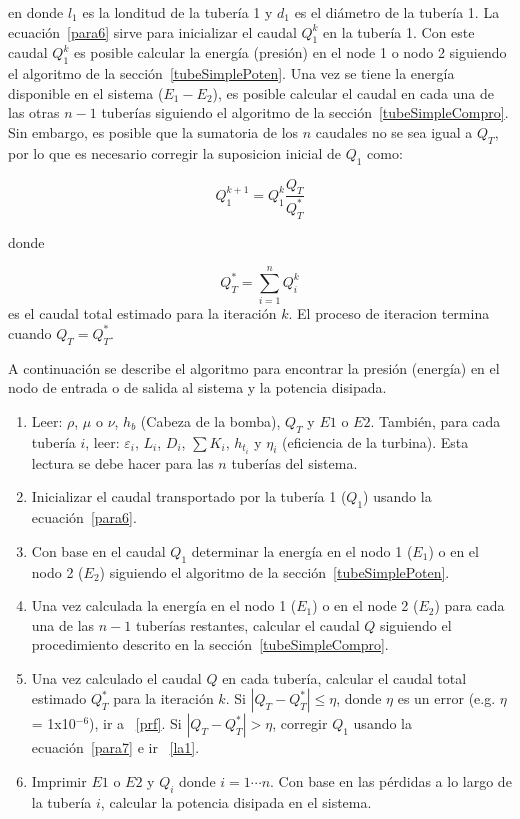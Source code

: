 \documentclass[11pt, oneside]{article}
\begin{document}
en donde $l_1$ es la londitud de la tuber\'ia 1 y $d_1$ es el di\'ametro de la tuber\'ia 1. La ecuaci\'on~\ref{para6} sirve para inicializar el caudal $Q_1^k$ en la tuber\'ia 1. Con este caudal $Q_1^k$ es posible calcular la energ\'ia (presi\'on) en el node 1 o nodo 2 siguiendo el algoritmo de la secci\'on~\ref{tubeSimplePoten}. Una vez se tiene la energ\'ia disponible en el sistema ($E_1-E_2$), es posible calcular el caudal en cada una de las otras $n-1$ tuber\'ias siguiendo el algoritmo de la secci\'on~\ref{tubeSimpleCompro}. Sin embargo, es posible que la sumatoria de los $n$ caudales no se sea igual a $Q_T$, por lo que es necesario corregir la suposicion inicial de $Q_1$ como:

\begin{equation}
Q_1^{k+1}= Q_1^k \frac{Q_T}{Q_T^*}
\label{para7}
\end{equation}

donde

\begin{equation}
Q_T^* = \sum_{i=1}^n Q_i^k 
\label{para8}
\end{equation}
es el caudal total estimado para la iteraci\'on $k$. El proceso de iteracion termina cuando $Q_T = Q_T^*$.

A continuaci\'on se describe el algoritmo para encontrar la presi\'on (energ\'ia) en el nodo de entrada o de salida al sistema y la potencia disipada. 

\begin{enumerate}
\item Leer: $\rho$, $\mu$ o $\nu$, $h_{b}$ (Cabeza de la bomba), $Q_T$ y $E1$ o $E2$. Tambi\'en, para cada tuber\'ia $i$, leer: $\varepsilon_i$, $L_i$, $D_i$, $\sum K_i$, $h_{t_i}$ y $\eta_i$ (eficiencia de la turbina). Esta lectura se debe hacer para las $n$ tuber\'ias del sistema.
\item Inicializar el caudal transportado por la tuber\'ia 1 ($Q_1$) usando la ecuaci\'on~\ref{para6}.
\item \label{la1} Con base en el caudal $Q_1$ determinar la energ\'ia en el nodo 1 ($E_1$) o en el nodo 2 ($E_2$) siguiendo el algoritmo de la secci\'on~\ref{tubeSimplePoten}.
\item Una vez calculada la energ\'ia en el nodo 1 ($E_1$) o en el node 2 ($E_2$) para cada una de las $n-1$ tuber\'ias restantes, calcular el caudal $Q$ siguiendo el procedimiento descrito en la secci\'on~\ref{tubeSimpleCompro}.  
\item Una vez calculado el caudal $Q$ en cada tuber\'ia, calcular el caudal total estimado $Q_T^*$ para la iteraci\'on $k$. Si $|Q_T - Q_T^*| \leq \eta$, donde $\eta$ es un error  (e.g. $\eta$ = 1x10$^{-6}$), ir a ~\ref{prf}. Si $|Q_T - Q_T^*| > \eta$, corregir $Q_1$ usando la ecuaci\'on~\ref{para7} e ir ~\ref{la1}.
\item \label{prf} Imprimir $E1$ o $E2$ y $Q_i$ donde $i=1 \cdots n$. Con base en las p\'erdidas a lo largo de la tuber\'ia $i$, calcular la potencia disipada en el sistema.
\end{enumerate}
\end{document}
